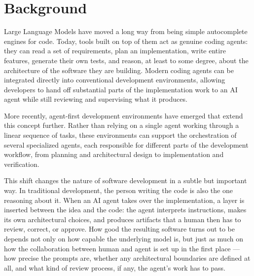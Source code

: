 \section{Background}

Large Language Models have moved a long way from being simple autocomplete engines for code. Today, tools built on top of them act as genuine coding agents: they can read a set of requirements, plan an implementation, write entire features, generate their own tests, and reason, at least to some degree, about the architecture of the software they are building. Modern coding agents can be integrated directly into conventional development environments, allowing developers to hand off substantial parts of the implementation work to an AI agent while still reviewing and supervising what it produces.

More recently, agent-first development environments have emerged that extend this concept further. Rather than relying on a single agent working through a linear sequence of tasks, these environments can support the orchestration of several specialized agents, each responsible for different parts of the development workflow, from planning and architectural design to implementation and verification.

This shift changes the nature of software development in a subtle but important way. In traditional development, the person writing the code is also the one reasoning about it. When an AI agent takes over the implementation, a layer is inserted between the idea and the code: the agent interprets instructions, makes its own architectural choices, and produces artifacts that a human then has to review, correct, or approve. How good the resulting software turns out to be depends not only on how capable the underlying model is, but just as much on how the collaboration between human and agent is set up in the first place --- how precise the prompts are, whether any architectural boundaries are defined at all, and what kind of review process, if any, the agent's work has to pass.

